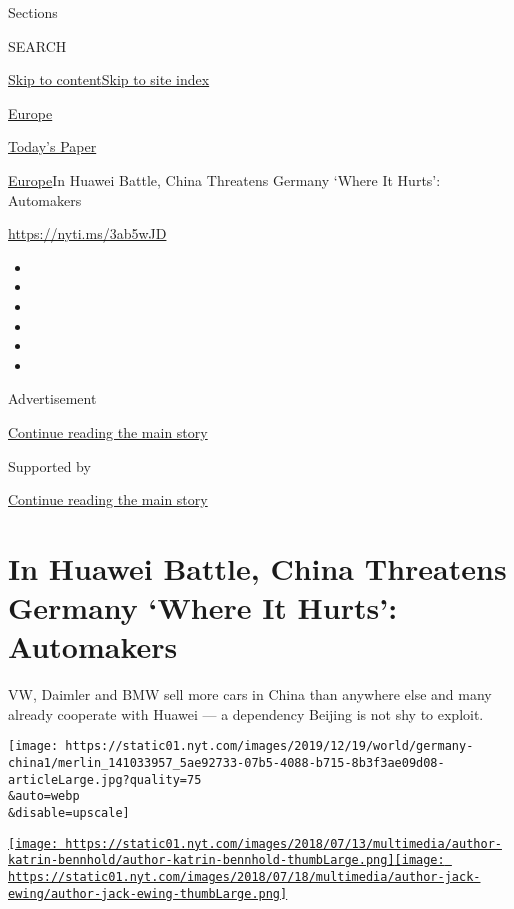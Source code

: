 Sections

SEARCH

\protect\hyperlink{site-content}{Skip to
content}\protect\hyperlink{site-index}{Skip to site index}

\href{https://www.nytimes.com/section/world/europe}{Europe}

\href{https://myaccount.nytimes.com/auth/login?response_type=cookie\&client_id=vi}{}

\href{https://www.nytimes.com/section/todayspaper}{Today's Paper}

\href{/section/world/europe}{Europe}\textbar{}In Huawei Battle, China
Threatens Germany `Where It Hurts': Automakers

\url{https://nyti.ms/3ab5wJD}

\begin{itemize}
\item
\item
\item
\item
\item
\item
\end{itemize}

Advertisement

\protect\hyperlink{after-top}{Continue reading the main story}

Supported by

\protect\hyperlink{after-sponsor}{Continue reading the main story}

\hypertarget{in-huawei-battle-china-threatens-germany-where-it-hurts-automakers}{%
\section{In Huawei Battle, China Threatens Germany `Where It Hurts':
Automakers}\label{in-huawei-battle-china-threatens-germany-where-it-hurts-automakers}}

VW, Daimler and BMW sell more cars in China than anywhere else and many
already cooperate with Huawei --- a dependency Beijing is not shy to
exploit.

\texttt{[image: https://static01.nyt.com/images/2019/12/19/world/germany-china1/merlin\_141033957\_5ae92733-07b5-4088-b715-8b3f3ae09d08-articleLarge.jpg?quality=75\\\&auto=webp\\\&disable=upscale]}

\href{https://www.nytimes.com/by/katrin-bennhold}{\texttt{[image: https://static01.nyt.com/images/2018/07/13/multimedia/author-katrin-bennhold/author-katrin-bennhold-thumbLarge.png]}}\href{https://www.nytimes.com/by/jack-ewing}{\texttt{[image: https://static01.nyt.com/images/2018/07/18/multimedia/author-jack-ewing/author-jack-ewing-thumbLarge.png]}}

